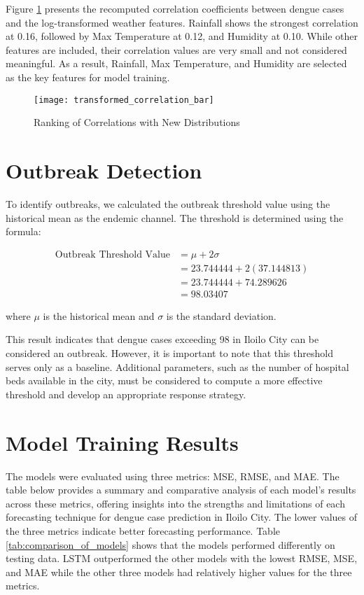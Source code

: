 Figure \ref{fig:transformed_correlation_bar} presents the recomputed correlation coefficients between dengue cases and the log-transformed weather features. Rainfall shows the strongest correlation at 0.16, followed by Max Temperature at 0.12, and Humidity at 0.10. While other features are included, their correlation values are very small and not considered meaningful. As a result, Rainfall, Max Temperature, and Humidity are selected as the key features for model training.

\begin{figure}[hbt!]
	\centering
	\texttt{[image: transformed\_correlation\_bar]}
	\caption{Ranking of Correlations with New Distributions}
	\label{fig:transformed_correlation_bar}
\end{figure}

\section{Outbreak Detection}  
To identify outbreaks, we calculated the outbreak threshold value using the historical mean as the endemic channel. The threshold is determined using the formula:  

\begin{align}  
	\text{Outbreak Threshold Value} &= \mu + 2\sigma \\  
	&= 23.744444 + 2(37.144813) \\  
	&= 23.744444 + 74.289626 \\  
	&= 98.03407  
\end{align}  

where \(\mu\) is the historical mean and \(\sigma \) is the standard deviation.

This result indicates that dengue cases exceeding 98 in Iloilo City can be considered an outbreak. However, it is important to note that this threshold serves only as a baseline. Additional parameters, such as the number of hospital beds available in the city, must be considered to compute a more effective threshold and develop an appropriate response strategy.

	
\section{Model Training Results}

The models were evaluated using three metrics: MSE, RMSE, and MAE. The table below provides a summary and comparative analysis of each model’s results across these metrics, offering insights into the strengths and limitations of each forecasting technique for dengue case prediction in Iloilo City. The lower values of the three metrics indicate better forecasting performance. Table \ref{tab:comparison_of_models} shows that the models performed differently on testing data. LSTM outperformed the other models with the lowest RMSE, MSE, and MAE while the other three models had relatively higher values for the three metrics.

